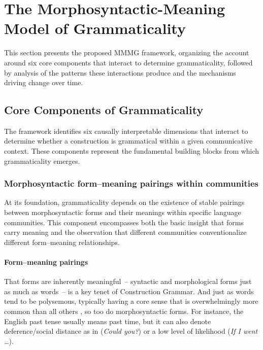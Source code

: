 \documentclass[12pt,letterpaper]{article}
\begin{document}
\section{The Morphosyntactic-Meaning Model of Grammaticality}\label{sec:framework}

This section presents the proposed MMMG framework, organizing the account around six core components that interact to determine grammaticality, followed by analysis of the patterns these interactions produce and the mechanisms driving change over time.

\subsection{Core Components of Grammaticality}\label{sec:core-components}

The framework identifies six causally interpretable dimensions that interact to determine whether a construction is grammatical within a given communicative context. These components represent the fundamental building blocks from which grammaticality emerges.

\subsubsection{Morphosyntactic form--meaning pairings within communities}\label{sec:f-m-pair-in-community}

At its foundation, grammaticality depends on the existence of stable pairings between morphosyntactic forms and their meanings within specific language communities. This component encompasses both the basic insight that forms carry meaning and the observation that different communities conventionalize different form--meaning relationships.

\paragraph{Form--meaning pairings}

That forms are inherently meaningful~-- syntactic and morphological forms just as much as words~-- is a key tenet of Construction Grammar. And just as words tend to be polysemous, typically having a core sense that is overwhelmingly more common than all others \autocite{Kilgarriff2004}, so too do morphosyntactic forms. For instance, the English past tense usually means past time, but it can also denote deference/social distance as in (\textit{Could you?}) or a low level of likelihood (\textit{If I went \dots}).
\end{document}

